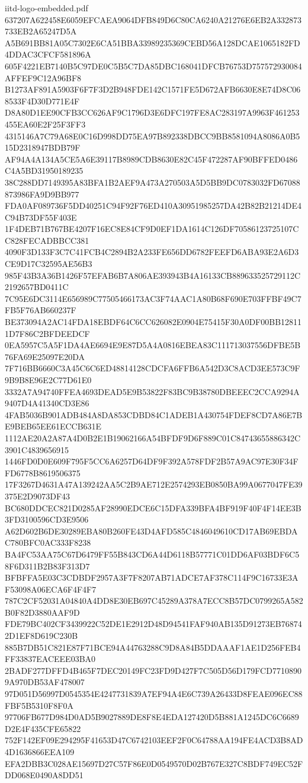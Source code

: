 \begin{filecontents*}[overwrite]{iitd-logo-embedded.pdf}
637207A622458E6059EFCAEA9064DFB849D6C80CA6240A21276E6EB2A332873733EB2A65247D5A
A5B691BB81A05C7302E6CA51BBA33989235369CEBD56A128DCAE1065182FD4DDAC3CFCF581896A
605F4221EB7140B5C97DE0C5B5C7DA85DBC168041DFCB76753D757572930084AFFEF9C12A96BF8
B1273AF891A5903F6F7F3D2B948FDE142C1571FE5D672AFB6630E8E74D8C068533F4D30D771E4F
D8A80D1EE90CFB3CC626AF9C1796D3E6DFC197FE8AC283197A9963F461253455EA60E2F25F3FF3
4315146A7C79A68E0C16D998DD75EA97B892338DBCC9BB8581094A8086A0B515D2318947BDB79F
AF94A4A134A5CE5A6E39117B8989CDB8630E82C45F472287AF90BFFED0486C4A5BD31950189235
38C288DD7149395A83BFA1B2AEF9A473A270503A5D5BB9DC0783032FD67088873986FA9D9BB977
FDA0AF089736F5DD40251C94F92F76ED410A30951985257DA42B82B21214DE4C94B73DF55F403E
1F4DEB71B767BE4207F16EC8E84CF9D0EF1DA1614C126DF70586123725107CC828FECADBBCC381
4090F3D133F3C7C41FCB4C2894B2A233FE656DD6782FEEFD6ABA93E2A6D3CE9D17C32595AE56B3
985F43B3A36B1426F57EFAB6B7A806AE393943B4A16133CB889633525729112C2192657BD0411C
7C95E6DC3114E656989C77505466173AC3F74AAC1A80B68F690E703FFBF49C7FB5F76AB660237F
BE373094A2AC14FDA18EBDF64C6CC626082E0904E75415F30A0DF00BB128111D7F86C2BFDEEDCF
0EA5957C5A5F1DA4AE6694E9E87D5A4A0816EBEA83C111713037556DFBE5B76FA69E25097E20DA
7F716BB6660C3A45C6C6ED48814128CDCFA6FFB6A542D3C8ACD3EE573C9F9B9B8E96E2C77D61E0
3332A7A94740FFEA4693DEAD5E9B53822F83BC9B38780DBEEEC2CCA9294A9407D4A41340CD3E86
4FAB5036B901ADB484A8DA853CDBD84C1ADEB1A430754FDEF8CD7A86E7BE9BEB65EE61ECCB631E
1112AE20A2A87A4D0B2E1B19062166A54BFDF9D6F889C01C84743655886342C3901C4839656915
1446FD0D0E609F795F5CC6A6257D64DF9F392A578FDF2B57A9AC97E30F34FFD6778B8619506375
17F3267D4631A47A139242AA5C2B9AE712E2574293EB0850BA99A0677047FE39375E2D9073DF43
BC680DDCEC821D0285AF28990EDCE6C15DFA339BFA4BF919F40F4F14EE3B3FD3100596CD3E9506
A62D602B6DE30289EBA80B260FE43D4AFD585C4846049610CD17AB69EBDAC780BFC0AC333F8238
BA4FC53AA75C67D6479FF55B843CD6A44D6118B57771C01DD6AF03BDF6C58F6D311B2B83F313D7
BFBFFA5E03C3CDBDF2957A3F7F8207AB71ADCE7AF378C114F9C16733E3AF53098A06ECA6F4F4F7
787C2CF52031A04840A4DD8E30EB697C45289A378A7ECC8B57DC0799265A582B0F82D3880AAF9D
FDE79BC402CF3439922C52DE1E2912D48D94541FAF940AB135D91273EB768742D1EF8D619C230B
885B7DB51C821E87F71BCE94A44763288C9D8A84B5DDAAAF1AE1D256FEB4FF33837EACEEE03BA0
2BADF277DFFD4B465F7DEC20149FC23FD9D427F7C505D56D179FCD77108909A970DB53AF478007
97D051D56997D0545354E4247731839A7EF94A4E6C739A26433D8FEAE096EC88FBF5B5310F8F0A
97706FB677D984D0AD5B9027889DE8F8E4EDA127420D5B881A1245DC6C6689D2E4F435CFE65822
752F142EF09E294295F41653D47C6742103EEF2F0C64788AA194FE4ACD3B8AD4D1636866EEA109
EFA2DBB3C028AE15697D27C57F86E0D0549570D02B767E327C8BDF749EC52FDD068E0490A8DD51

\end{filecontents*}
